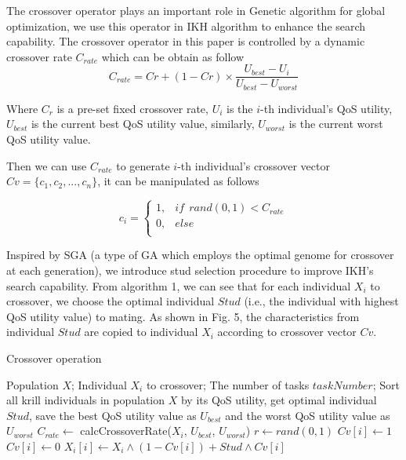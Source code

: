 \documentclass[10pt,journal,compsoc]{IEEEtran}
\begin{document}
The crossover operator plays an important role in Genetic algorithm for global optimization, we use this operator in IKH algorithm to enhance the search capability. The crossover operator in this paper is controlled by a dynamic crossover rate $C_{rate}$ which can be obtain as follow
\begin{equation}
C_{rate} = Cr + (1-Cr) \times \frac{U_{best}-U_{i}}{U_{best}-U_{worst}}
\end{equation}

Where $C_r$ is a pre-set fixed crossover rate, $U_{i}$ is the $i$-th individual's QoS utility, $U_{best}$ is the current best QoS utility value, similarly, $U_{worst}$ is the current worst QoS utility value. 

Then we can use $C_{rate}$ to generate $i$-th individual's crossover vector $Cv = \{c_{1},c_{2},...,c_{n}\}$, it can be manipulated as follows

\begin{equation}
c_{i}=
\begin{cases}
1,& if \ \ rand(0,1) < C_{rate}\\
0,& else\\
\end{cases}
\end{equation}

Inspired by SGA \cite{khatib1998stud} (a type of GA which employs the optimal genome for crossover at each generation), we introduce stud selection procedure to improve IKH's search capability.
From algorithm 1, we can see that for each individual $X_i$ to crossover, we choose the optimal individual $Stud$ (i.e., the individual with highest QoS utility value) to mating. As shown in Fig. 5, the characteristics from individual $Stud$ are copied to individual $X_i$ according to crossover vector $Cv$. 

\begin{algorithm}
\caption{Crossover operation}
\label{alg1}
\begin{algorithmic}[1]

\REQUIRE Population $X$; Individual $X_i$ to crossover; The number of tasks $taskNumber$; 
\STATE Sort all krill individuals in population $X$ by its QoS utility, get optimal individual $Stud$, save the best QoS utility value as $U_{best}$ and the worst QoS utility value as $U_{worst}$
\STATE $C_{rate} \leftarrow$ calcCrossoverRate($X_i$, $U_{best}$, $U_{worst}$)
\STATE $r \leftarrow rand(0,1)$
\STATE $Cv[i] \leftarrow 1$
\ELSE
\STATE $Cv[i] \leftarrow 0$
\ENDIF
\ENDFOR
{}
\STATE $X_i[i] \leftarrow X_i \wedge  (1-Cv[i]) + Stud \wedge Cv[i]$ 
\ENDFOR
\end{algorithmic}
\end{algorithm}
\end{document}
